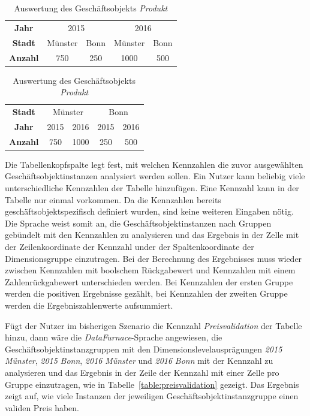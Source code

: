 \documentclass[
  language=german, %
  type=bachelor,%
  ngerman
]{isthesis}
\begin{document}
\begin{content}
  \begin{table}
    \footnotesize
    \begin{tabular}{c c c c c}
      \textbf{Jahr} & \multicolumn{2}{c}{2015} & \multicolumn{2}{c}{2016} \\
      \cmidrule(lr){2-3}\cmidrule(lr){4-5}
      \textbf{Stadt} & Münster & Bonn & Münster & Bonn \\
      \toprule
      \textbf{Anzahl} & 750 & 250 & 1000 & 500\\
    \end{tabular}
    \hfill
    \begin{tabular}{c c c c c}
      \textbf{Stadt} & \multicolumn{2}{c}{Münster} & \multicolumn{2}{c}{Bonn} \\
      \cmidrule(lr){2-3}\cmidrule(lr){4-5}
      \textbf{Jahr} & 2015 & 2016 & 2015 & 2016 \\
      \toprule
      \textbf{Anzahl} & 750 & 1000 & 250 & 500 \\
    \end{tabular}
    \caption{Auswertung des Geschäftsobjekts \textit{Produkt}}\label{table:auftrittsreihenfolge}
  \end{table}

  Die Tabellenkopfspalte legt fest, mit welchen Kennzahlen die zuvor
  ausgewählten Geschäftsobjektinstanzen analysiert werden sollen. Ein Nutzer
  kann beliebig viele unterschiedliche Kennzahlen der Tabelle hinzufügen. Eine
  Kennzahl kann in der Tabelle nur einmal vorkommen. Da die Kennzahlen bereits
  geschäftsobjektspezifisch definiert wurden, sind keine weiteren Eingaben
  nötig. Die Sprache weist somit an, die Geschäftsobjektinstanzen nach Gruppen
  gebündelt mit den Kennzahlen zu analysieren und das Ergebnis in der Zelle mit
  der Zeilenkoordinate der Kennzahl under der Spaltenkoordinate der
  Dimensionsgruppe einzutragen. Bei der Berechnung des Ergebnisses muss wieder
  zwischen Kennzahlen mit boolschem Rückgabewert und Kennzahlen mit einem
  Zahlenrückgabewert unterschieden werden. Bei Kennzahlen der ersten
  Gruppe werden die positiven Ergebnisse gezählt, bei Kennzahlen der zweiten
  Gruppe werden die Ergebniszahlenwerte aufsummiert.
  
	Fügt der Nutzer im bisherigen Szenario die Kennzahl \textit{Preisvalidation}
	der Tabelle hinzu, dann wäre die \textit{DataFurnace}-Sprache angewiesen, die
	Geschäftsobjektinstanzgruppen mit den Dimensionslevelausprägungen
	\textit{2015} \textit{Münster}, \textit{2015} \textit{Bonn}, \textit{2016}
	\textit{Münster} und \textit{2016} \textit{Bonn} mit der Kennzahl zu analysieren
	und das Ergebnis in der Zeile der Kennzahl mit einer Zelle pro Gruppe
	einzutragen, wie in Tabelle~\ref{table:preisvalidation} gezeigt. Das Ergebnis
	zeigt auf, wie viele Instanzen der jeweiligen Geschäftsobjektinstanzgruppe
	einen validen Preis haben.


\end{content}
\end{document}
